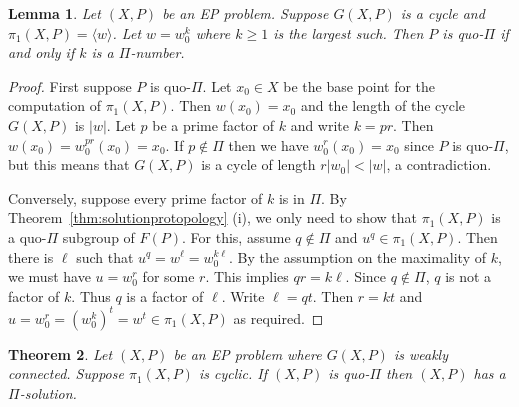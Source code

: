 \documentclass[11pt]{amsart}
\newtheorem{theorem}{Theorem}[section]
\newtheorem{lemma}[theorem]{Lemma}
\theoremstyle{definition}
\theoremstyle{definition}
\numberwithin{equation}{section}
\begin{document}
\begin{lemma}\label{lem:pfk} Let $(X, P)$ be an EP problem. Suppose $G(X, P)$ is a cycle and $\pi_1(X, P)=\langle w\rangle$. Let $w=w_0^k$  where $k\geq 1$ is the largest such. Then $P$ is quo-$\Pi$ if and only if $k$ is a $\Pi$-number.
\end{lemma}

\begin{proof} First suppose $P$ is quo-$\Pi$. Let $x_0\in X$ be the base point for the computation of $\pi_1(X,P)$. Then $w(x_0)=x_0$ and the length of the cycle $G(X,P)$ is $|w|$. Let $p$ be a prime factor of $k$ and write $k=pr$. Then $w(x_0)=w_0^{pr}(x_0)=x_0$. If $p\not\in \Pi$ then we have $w_0^r(x_0)=x_0$ since $P$ is quo-$\Pi$, but this means that $G(X,P)$ is a cycle of length $r|w_0|<|w|$, a contradiction.

Conversely, suppose every prime factor of $k$ is in $\Pi$. By Theorem~\ref{thm:solutionprotopology} (i), we only need to show that $\pi_1(X, P)$ is a quo-$\Pi$ subgroup of $F(P)$. For this, assume $q\not\in\Pi$ and $u^q\in \pi_1(X, P)$. Then there is $\ell$ such that $u^q=w^\ell=w_0^{k\ell}$. By the assumption on the maximality of $k$, we must have $u=w_0^r$ for some $r$. This implies $qr=k\ell$. Since $q\not\in \Pi$, $q$ is not a factor of $k$. Thus $q$ is a factor of $\ell$. Write $\ell=qt$. Then $r=kt$
and $u=w_0^r=(w_0^k)^t=w^t\in \pi_1(X, P)$ as required.
\end{proof}

\begin{theorem}\label{thm:cyclic} Let $(X, P)$ be an EP problem where $G(X, P)$ is weakly connected. Suppose $\pi_1(X, P)$ is cyclic. If $(X, P)$ is quo-$\Pi$ then $(X, P)$ has a $\Pi$-solution.
\end{theorem}
\end{document}
